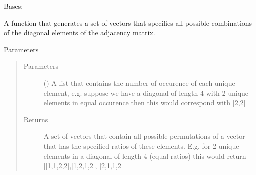 \documentclass[letterpaper,10pt,english]{sphinxmanual}
\begin{document}
\begin{fulllineitems}
\label{\detokenize{modules/gqcml.data_generators:gqcml.data_generators.graph_sampler.graph_sampler}}
Bases: 

\begin{fulllineitems}
\label{\detokenize{modules/gqcml.data_generators:gqcml.data_generators.graph_sampler.graph_sampler.convert_triu_to_mat}}
\end{fulllineitems}


\begin{fulllineitems}
\label{\detokenize{modules/gqcml.data_generators:gqcml.data_generators.graph_sampler.graph_sampler.generate_diagonal_vector}}
A function that generates a set of vectors that specifies all possible combinations of the diagonal elements of the adjacency matrix.

Parameters
\begin{quote}\begin{description}
\item[{Parameters}] \leavevmode
\sphinxstyleliteralstrong{\sphinxupquote{(}}\sphinxstyleliteralstrong{\sphinxupquote{)}} () \textendash{} A list that contains the number of occurence of each unique element,
e.g. suppose we have a diagonal of length 4 with 2 unique elements in equal occurence then this would
correspond with {[}2,2{]}

\item[{Returns}] \leavevmode
A set of vectors that contain all possible permutations of a vector that has the
specified ratios of these elements. E.g. for 2 unique elements in a diagonal of length 4 (equal ratios)
this would return {[}{[}1,1,2,2{]},{[}1,2,1,2{]}, {[}2,1,1,2{]}


\end{description}
\end{quote}
\end{fulllineitems}
\end{fulllineitems}
\end{document}

